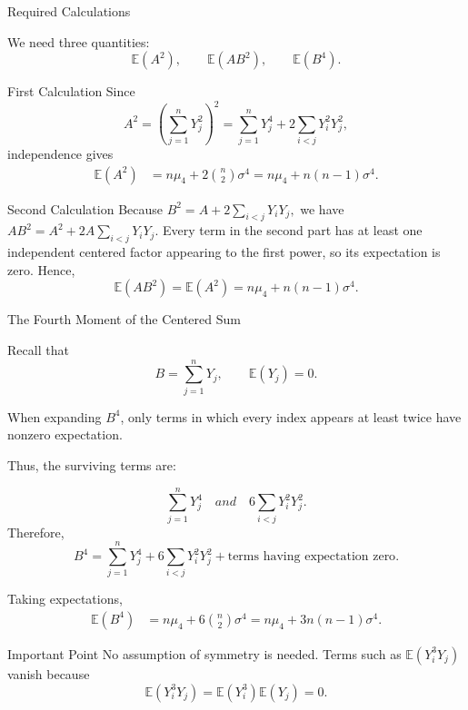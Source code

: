 \begin{frame}{Required Calculations}

\small

We need three quantities:
\[
\mathbb{E}(A^2),
\qquad
\mathbb{E}(AB^2),
\qquad
\mathbb{E}(B^4).
\]

\begin{keybox}{First Calculation}
Since
\[
A^2
=
\left(\sum_{j=1}^nY_j^2\right)^2
=
\sum_{j=1}^nY_j^4
+
2\sum_{i<j}Y_i^2Y_j^2,
\]
independence gives
\[
\begin{aligned}
\mathbb{E}(A^2)
&=
n\mu_4
+
2\binom{n}{2}\sigma^4 =
n\mu_4+n(n-1)\sigma^4.
\end{aligned}
\]
\end{keybox}

\begin{keybox}{Second Calculation}
Because $B^2
=
A+2\sum_{i<j}Y_iY_j,$ we have $AB^2
=
A^2
+
2A\sum_{i<j}Y_iY_j.$
Every term in the second part has at least one independent centered factor
appearing to the first power, so its expectation is zero. Hence,
\[
\boxed{
\mathbb{E}(AB^2)
=
\mathbb{E}(A^2)
=
n\mu_4+n(n-1)\sigma^4.
}
\]
\end{keybox}

\end{frame}




\begin{frame}{The Fourth Moment of the Centered Sum}

\small

Recall that
\[
B=\sum_{j=1}^nY_j,
\qquad
\mathbb{E}(Y_j)=0.
\]

When expanding \(B^4\), only terms in which every index appears at least twice
have nonzero expectation.

Thus, the surviving terms are:

\[
\sum_{j=1}^nY_j^4 \quad and \quad 6\sum_{i<j}Y_i^2Y_j^2.
\]
Therefore,
\[
B^4
=
\sum_{j=1}^nY_j^4
+
6\sum_{i<j}Y_i^2Y_j^2
+
\text{terms having expectation zero}.
\]

Taking expectations,
\[
\begin{aligned}
\mathbb{E}(B^4)
&=
n\mu_4
+
6\binom{n}{2}\sigma^4 =
n\mu_4
+
3n(n-1)\sigma^4.
\end{aligned}
\]

\begin{keybox}{Important Point}
No assumption of symmetry is needed. Terms such as
\(\mathbb{E}(Y_i^3Y_j)\) vanish because
\[
\mathbb{E}(Y_i^3Y_j)
=
\mathbb{E}(Y_i^3)\mathbb{E}(Y_j)=0.
\]
\end{keybox}

\end{frame}




